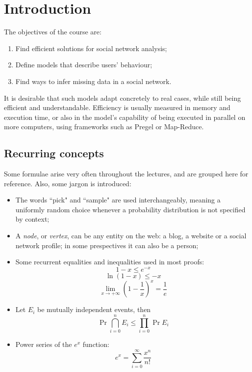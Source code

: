\chapter{Introduction}
    
The objectives of the course are:
\begin{enumerate}
    \item Find efficient solutions for social network analysis;
    \item Define models that describe users' behaviour;
    \item Find ways to infer missing data in a social network.
\end{enumerate}

It is desirable that such models adapt concretely to real cases, while still being efficient and understandable. Efficiency is usually measured in memory and execution time, or also in the model's capability of being executed in parallel on more computers, using frameworks such as Pregel or Map-Reduce.


\section{Recurring concepts}

Some formulae arise very often throughout the lectures, and are grouped here for reference. Also, some jargon is introduced:

\begin{itemize}
    \item The words ``pick" and ``sample" are used interchangeably, meaning a uniformly random choice whenever a probability distribution is not specified by context;
    \item A \emph{node}, or \emph{vertex}, can be any entity on the web: a blog, a website or a social network profile; in some prespectives it can also be a person;
    \item Some recurrent equalities and inequalities used in most proofs:
        \begin{equation}\label{eq:e-x}
            1 - x \leq e^{-x}
        \end{equation}
        \begin{equation}\label{eq:ln-1-x}
            \ln(1 - x) \leq -x
        \end{equation}
        \begin{equation}\label{eq:limit-1/e}
            \lim_{x \to +\infty} \left(1 - \frac{1}{x}\right)^x = \frac{1}{e}
        \end{equation}
    \item Let $E_i$ be mutually independent events, then
        \begin{equation}\label{eq:prob}
            \Pr{\bigcap_{i=0}^n E_i} \leq \prod_{i=0}^{n}\Pr{E_i}
        \end{equation}
    \item Power series of the $e^x$ function:
        \begin{equation}\label{eq:epow}
            e^x = \sum_{i = 0}^{\infty} \frac{x^n}{n!}
        \end{equation}
\end{itemize}


